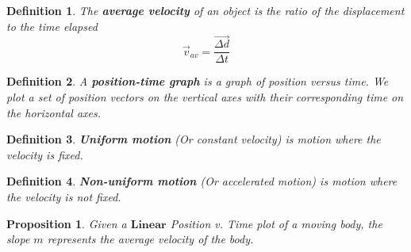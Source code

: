 \documentclass[12pt]{article}
\theoremstyle{break}
\newtheorem*{defn}{Definition}[subsection]
\newtheorem*{prop}[thm]{Proposition}
\begin{document}
\begin{defn}
    The \textbf{average velocity} of an object is the ratio of the displacement to the time elapsed
    $$\vec v_{av} = \frac{\overrightarrow{\Delta d}}{\Delta t}$$
\end{defn}

\begin{defn}
    A \textbf{position-time graph} is a graph of position versus time. We plot a set of position vectors on the vertical axes with their corresponding time on the horizontal axes. 
\end{defn}

\begin{defn}
	\textbf{Uniform motion} (Or constant velocity) is motion where the velocity is fixed.
\end{defn}

\begin{defn}
	\textbf{Non-uniform motion} (Or accelerated motion) is motion where the velocity is \emph{not} fixed.
\end{defn}

\begin{prop}
	Given a $\textbf{Linear}$ Position v. Time plot of a moving body, the slope $m$ represents the average velocity of the body.
\end{prop}






	
\end{document}
